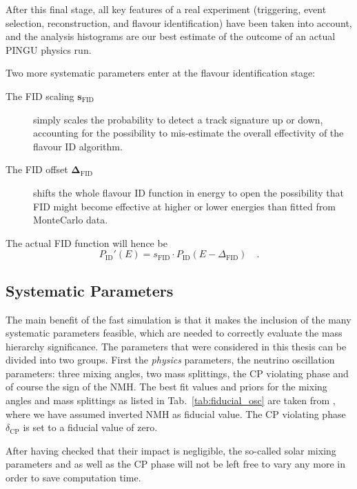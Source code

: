 After this final stage, all key features of a real experiment (triggering,
event selection, reconstruction, and flavour identification) have been taken
into account, and the analysis histograms are our best estimate of the outcome
of an actual PINGU physics run.

Two more systematic parameters enter at the flavour identification stage:
\begin{description}
 \item[The FID scaling $\mathbf{s_\mathrm{FID}}$] simply scales the probability
  to detect a track signature up or down, accounting for the possibility to
  mis-estimate the overall effectivity of the flavour ID algorithm.
 \item[The FID offset $\mathbf{\Delta_\mathrm{FID}}$] shifts the whole flavour
  ID function in energy to open the possibility that FID might become effective
  at higher or lower energies than fitted from MonteCarlo data.
\end{description}
The actual FID function will hence be
\begin{equation}
 P_\mathrm{ID}'(E) = s_\mathrm{FID}\cdot P_\mathrm{ID}(E-\Delta_\mathrm{FID})
   \quad.
\end{equation}




\subsection{Systematic Parameters}
\label{sec:systematics}

The main benefit of the fast simulation is that it makes the inclusion of
the many systematic parameters feasible, which are needed to correctly evaluate
the mass hierarchy significance. The parameters that were considered in this
thesis can be divided into two groups. First the \emph{physics} parameters,
\ie the neutrino oscillation parameters: three mixing angles, two mass
splittings, the CP violating phase and of course the sign of the NMH. The best
fit values and priors for the mixing angles and mass splittings as listed in
Tab.~\ref{tab:fiducial_osc} are taken from \cite{Fogli}, where we have assumed
inverted NMH as fiducial value. The CP violating phase $\delta_\mathrm{CP}$ is
set to a fiducial value of zero.

After having checked that their impact is negligible, the so-called solar mixing
parameters  and  as well as the CP phase will not be left free
to vary any more in order to save computation time.

